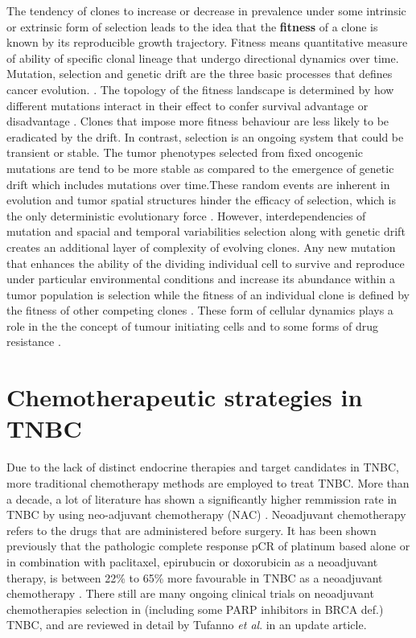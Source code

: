 The tendency of clones to increase or decrease in prevalence under some intrinsic or extrinsic form of selection leads to the idea that the \textbf{fitness} of a clone is known by its reproducible growth trajectory. Fitness means quantitative measure of ability of specific clonal lineage that undergo directional dynamics over time. 
Mutation, selection and genetic drift are the three basic processes that defines cancer evolution. \cite{lipinski2016cancer,szendro2013predictability}.
The topology of the fitness landscape is determined by how different mutations interact in their effect to confer survival advantage or disadvantage \cite{de2014empirical}. Clones that impose more fitness behaviour are less likely to be eradicated by the drift.
In contrast, selection is an ongoing system that could be transient or stable. The tumor phenotypes selected from fixed oncogenic mutations \cite{sidransky1992clonal,j2010mutator} are tend to be more stable as compared to the emergence of genetic drift which includes mutations over time.These random events are inherent in evolution and tumor spatial structures hinder the efficacy of selection, which is the only deterministic evolutionary force \cite{szendro2013predictability}.
However, interdependencies of mutation and spacial and temporal variabilities selection along with genetic drift creates an additional layer of complexity of evolving clones. Any new mutation that enhances the ability of the dividing individual cell to survive and reproduce under particular environmental conditions and increase its abundance within a tumor population is selection while the fitness of an individual clone is defined by the fitness of other competing clones \cite{jain2007deterministic,gerrish1998fate}. These form of cellular dynamics plays a role in the the concept of tumour initiating cells \cite{magee2012cancer} and to some forms of drug resistance \cite{shaffer2017rare, kreso2013variable}.


\section{Chemotherapeutic strategies in TNBC}
Due to the lack of distinct endocrine therapies and target candidates in TNBC, more traditional chemotherapy methods are employed to treat TNBC. More than a decade, a lot of literature has shown a significantly higher remmission rate in TNBC by using neo-adjuvant chemotherapy (NAC) \cite{liedtke2008response,symmans2017long}. Neoadjuvant chemotherapy refers to the drugs that are administered before surgery. It has been shown previously that the pathologic complete response \ac{pCR} of platinum based alone or in combination with paclitaxel, epirubucin or doxorubicin as a neoadjuvant therapy, is between 22\% to 65\% 
more favourable in TNBC as a neoadjuvant chemotherapy \cite{silver2010efficacy,petrelli2014value,garber2006neo,frasci2009preoperative}. There still are many ongoing clinical trials on neoadjuvant chemotherapies selection in (including some PARP inhibitors in BRCA def.) TNBC, and are reviewed in detail by Tufanno \textit{et al}. \cite{tufano2020updates} in an update article.

